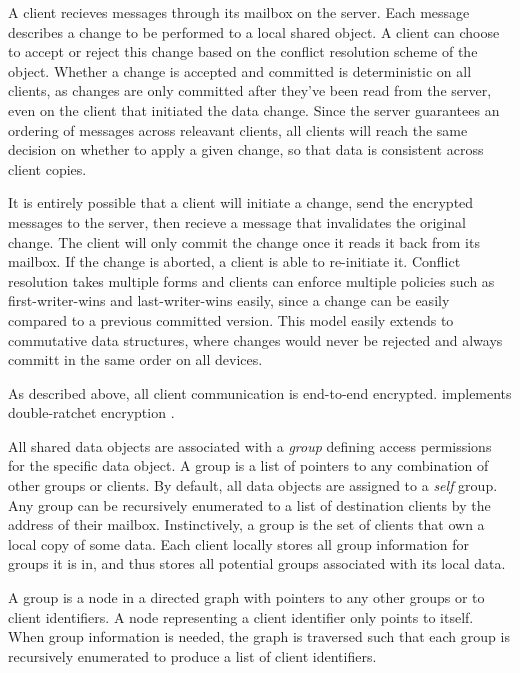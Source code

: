 A client recieves messages through its mailbox on the server. Each message describes a change to be performed to a local shared object. A client can choose to accept or reject this change based on the conflict resolution scheme of the object. Whether a change is accepted and committed is deterministic on all clients, as changes are only committed after they've been read from the server, even on the client that initiated the data change. Since the server guarantees an ordering of messages across releavant clients, all clients will reach the same decision on whether to apply a given change, so that data is consistent across client copies. 

It is entirely possible that a client will initiate a change, send the encrypted messages to the server, then recieve a message that invalidates the original change. The client will only commit the change once it reads it back from its mailbox. If the change is aborted, a client is able to re-initiate it. Conflict resolution takes multiple forms and \name{} clients can enforce multiple policies such as first-writer-wins and last-writer-wins easily, since a change can be easily compared to a previous committed version. This model easily extends to commutative data structures, where changes would never be rejected and always committ in the same order on all devices.

As described above, all client communication is end-to-end encrypted. \name{} implements double-ratchet encryption \tocite{}. 
 

All shared data objects are associated with a \textit{group} defining access permissions for the specific data object. A group is a list of pointers to any combination of other groups or clients. By default, all \name{} data objects are assigned to a \textit{self} group. Any group can be recursively enumerated to a list of destination clients by the address of their mailbox. Instinctively, a group is the set of clients that own a local copy of some data.
Each client locally stores all group information for groups it is in, and thus stores all potential groups associated with its local data. 

A group is a node in a directed graph with pointers to any other groups or to client identifiers. A node representing a client identifier only points to itself. When group information is needed, the graph is traversed such that each group is recursively enumerated to produce a list of client identifiers. 

